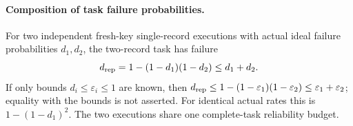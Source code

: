 \paragraph{Composition of task failure probabilities.}
For two independent fresh-key single-record executions with actual ideal
failure probabilities \(d_1,d_2\), the two-record task has failure
\[
 d_{\rm rep}=1-(1-d_1)(1-d_2)\le d_1+d_2.
\]
If only bounds \(d_i\le\varepsilon_i\le1\) are known, then
\(d_{\rm rep}\le1-(1-\varepsilon_1)(1-\varepsilon_2)
\le\varepsilon_1+\varepsilon_2\); equality with the bounds is not asserted.
For identical actual rates this is \(1-(1-d_1)^2\).
The two executions share one complete-task reliability budget.
